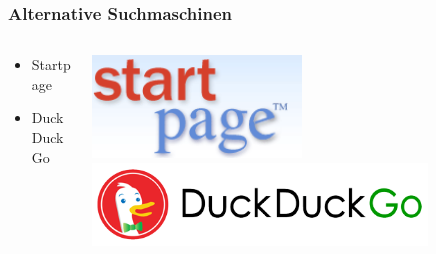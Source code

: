   \begin{frame}
    \frametitle{Alternative Suchmaschinen}
    \begin{columns}
        \begin{column}{5cm}
            \begin{center}
                    \begin{itemize}
                            \item Startpage
                            \vspace{2cm}
                            \item DuckDuckGo
                    \end{itemize}
            \end{center}
        \end{column}
        \begin{column}{5cm}
            \begin{center}
                \includegraphics[width=0.5\textwidth]{../../img/startp_logo.png}
                \vspace{1cm}
                \includegraphics[width=0.8\textwidth]{../../img/duckduckgo.png}
            \end{center}
        \end{column}
    \end{columns}
  \end{frame}
